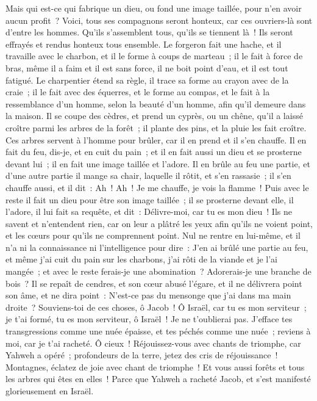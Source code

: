\begin{multicols}{2}
Mais qui est-ce qui fabrique un dieu, ou fond une image taillée, pour n'en avoir aucun profit~?
Voici, tous ses compagnons seront honteux, car ces ouvriers-là sont d'entre les hommes. Qu'ils s'assemblent tous, qu'ils se tiennent là~! Ils seront effrayés et rendus honteux tous ensemble.
Le forgeron fait une hache, et il travaille avec le charbon, et il le forme à coups de marteau~; il le fait à force de bras, même il a faim et il est sans force, il ne boit point d'eau, et il est tout fatigué.
Le charpentier étend sa règle, il trace sa forme au crayon avec de la craie~; il le fait avec des équerres, et le forme au compas, et le fait à la ressemblance d'un homme, selon la beauté d'un homme, afin qu'il demeure dans la maison.
Il se coupe des cèdres, et prend un cyprès, ou un chêne, qu'il a laissé croître parmi les arbres de la forêt~; il plante des pins, et la pluie les fait croître.
Ces arbres servent à l'homme pour brûler, car il en prend et il s'en chauffe. Il en fait du feu, dis-je, et en cuit du pain~; et il en fait aussi un dieu et se prosterne devant lui~; il en fait une image taillée et l'adore.
Il en brûle au feu une partie, et d'une autre partie il mange sa chair, laquelle il rôtit, et s'en rassasie~; il s'en chauffe aussi, et il dit~: Ah~! Ah~! Je me chauffe, je vois la flamme~!
Puis avec le reste il fait un dieu pour être son image taillée~; il se prosterne devant elle, il l'adore, il lui fait sa requête, et dit~: Délivre-moi, car tu es mon dieu~!
Ils ne savent et n'entendent rien, car on leur a plâtré les yeux afin qu'ils ne voient point, et les cœurs pour qu'ils ne comprennent point.
Nul ne rentre en lui-même, et il n'a ni la connaissance ni l'intelligence pour dire~: J'en ai brûlé une partie au feu, et même j'ai cuit du pain sur les charbons, j'ai rôti de la viande et je l'ai mangée~; et avec le reste ferais-je une abomination~? Adorerais-je une branche de bois~?
Il se repaît de cendres, et son cœur abusé l'égare, et il ne délivrera point son âme, et ne dira point~: N'est-ce pas du mensonge que j'ai dans ma main droite~?
Souviens-toi de ces choses, ô Jacob~! Ô Israël, car tu es mon serviteur~; je t'ai formé, tu es mon serviteur, ô Israël~! Je ne t'oublierai pas.
J'efface tes transgressions comme une nuée épaisse, et tes péchés comme une nuée~; reviens à moi, car je t'ai racheté.
Ô cieux~! Réjouissez-vous avec chants de triomphe, car Yahweh a opéré~; profondeurs de la terre, jetez des cris de réjouissance~! Montagnes, éclatez de joie avec chant de triomphe~! Et vous aussi forêts et tous les arbres qui êtes en elles~! Parce que Yahweh a racheté Jacob, et s'est manifesté glorieusement en Israël.

\end{multicols}
